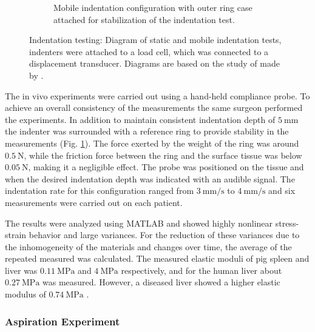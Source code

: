 \begin{figure}
\begin{subfigure}[b]{0.45\textwidth}
        \caption{Mobile indentation configuration with outer ring case attached for stabilization of the indentation test.}
        \label{fig:carter2}
        \end{subfigure}
        \hspace{0.3cm}
        \caption[Indentation testing setup of synthetic and biological tissues by \citet{Carter2001}]{Indentation testing: Diagram of static and mobile indentation tests, indenters were attached to a load cell, which was connected to a displacement transducer. Diagrams are based on the study of made by \citet{Carter2001}.}
        \label{fig:indentationcarter}
\end{figure}

The in vivo experiments were carried out using a hand-held compliance probe. To achieve 
an overall consistency of the measurements the same surgeon performed the experiments. 
In addition to maintain consistent indentation depth of $\SI{5}{\milli \m}$ the indenter was 
surrounded with a reference ring to provide stability in the measurements (Fig. \ref{fig:carter2}). The force 
exerted by the weight of the ring was around $\SI{0.5}{\newton}$, while the friction force 
between the ring and the surface tissue was below $\SI{0.05}{\newton}$, making it a negligible 
effect. The probe was positioned on the tissue and when the desired indentation depth was 
indicated with an audible signal. The indentation rate for this configuration ranged 
from $\SI[per-mode = symbol]{3}{\milli \m\per \second}$ to $\SI[per-mode = symbol]{4}{\milli \m\per \second}$ and 
six measurements were carried out on each patient.

The results were analyzed using MATLAB and showed highly nonlinear stress-strain behavior and large variances. 
For the reduction of these variances due to the inhomogeneity of the materials and changes over time, 
the average of the repeated measured was calculated. The measured elastic moduli of pig 
spleen and liver was $\SI{0.11}{\mega \pascal}$ and $\SI{4}{\mega \pascal}$ respectively, and 
for the human liver about $\SI{0.27}{\mega \pascal}$ was measured. However, a 
diseased liver showed a higher elastic modulus of $\SI{0.74}{\mega \pascal}$ \cite{Carter2001}.
\subsubsection*{Aspiration Experiment}

